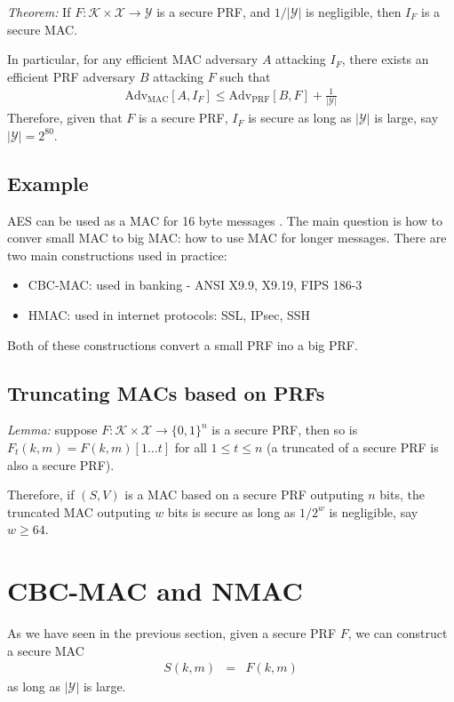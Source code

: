 \documentclass{article}
\begin{document}
\emph{Theorem: } If $F : \mathcal{K} \times \mathcal{X} \to \mathcal{Y}$ is a
secure PRF, and $1 / | \mathcal{Y}|$ is negligible, then $I_F$ is a secure MAC.

In particular, for any efficient MAC adversary $A$ attacking $I_F$, there exists
an efficient PRF adversary $B$ attacking $F$ such that
\begin{eqnarray}
  \text{Adv}_\text{MAC} [ A, I_F] \le \text{Adv}_\text{PRF} [B, F] +
  \frac{1}{|\mathcal{Y}|} 
\end{eqnarray}
Therefore, given that $F$ is a secure PRF, $I_F$ is secure as long as
$|\mathcal{Y}|$ is large, say $|\mathcal{Y}| = 2^{80}$.

\subsection{Example}
AES can be used as a MAC for 16 byte messages . The main question is how to
conver small MAC to big MAC: how to use MAC for longer messages. There are two
main constructions used in practice:
\begin{itemize}
\item CBC-MAC: used in banking -  ANSI X9.9, X9.19, FIPS 186-3
\item HMAC: used in internet protocols: SSL, IPsec, SSH
\end{itemize}
Both of these constructions convert a small PRF ino a big PRF.

\subsection{Truncating MACs based on PRFs}
\emph{Lemma: } suppose $F: \mathcal{K} \times \mathcal{X} \to \lbrace 0, 1
\rbrace^n$ is a secure PRF, then so is $F_t(k, m) = F( k, m)[1 \dotsc t]$ for
all $1 \le t \le n$ (a truncated of a secure PRF is also a secure PRF).

Therefore, if $(S,V)$ is a MAC based on a secure PRF outputing $n$ bits, the
truncated MAC outputing $w$ bits is secure as long as $1 / 2^w$ is negligible,
say $w \ge 64$.

\section{CBC-MAC and NMAC}

As we have seen in the previous section, given a secure PRF $F$, we can
construct a secure MAC 
\begin{eqnarray}
  S(k, m) &=& F(k, m)
\end{eqnarray}
as long as $|\mathcal{Y}|$ is large. 
\end{document}

